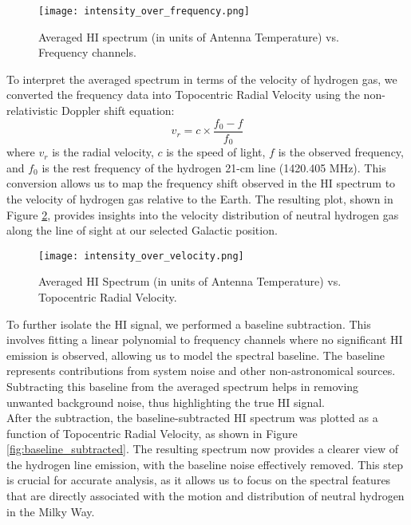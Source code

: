 \documentclass[linenumbers,twocolumn]{aastex631}
\begin{document}
\begin{figure}[h]
    \centering
    \texttt{[image: intensity\_over\_frequency.png]}
    \caption{Averaged HI spectrum (in units of Antenna Temperature) vs. Frequency channels.}
    \label{fig:intensity_over_frequency}
\end{figure}

To interpret the averaged spectrum in terms of the velocity of hydrogen gas, we converted the frequency data into Topocentric Radial Velocity using the non-relativistic Doppler shift equation:
\[
v_r = c \times \frac{f_0 - f}{f_0}
\]
where \(v_r\) is the radial velocity, \(c\) is the speed of light, \(f\) is the observed frequency, and \(f_0\) is the rest frequency of the hydrogen 21-cm line (1420.405 MHz). This conversion allows us to map the frequency shift observed in the HI spectrum to the velocity of hydrogen gas relative to the Earth. The resulting plot, shown in Figure \ref{fig:intensity_over_velocity}, provides insights into the velocity distribution of neutral hydrogen gas along the line of sight at our selected Galactic position. \\

\begin{figure}[h]
    \centering
    \texttt{[image: intensity\_over\_velocity.png]}
    \caption{Averaged HI Spectrum (in units of Antenna Temperature) vs. Topocentric Radial Velocity.}
    \label{fig:intensity_over_velocity}
\end{figure}

To further isolate the HI signal, we performed a baseline subtraction. This involves fitting a linear polynomial to frequency channels where no significant HI emission is observed, allowing us to model the spectral baseline. The baseline represents contributions from system noise and other non-astronomical sources. Subtracting this baseline from the averaged spectrum helps in removing unwanted background noise, thus highlighting the true HI signal. \\

After the subtraction, the baseline-subtracted HI spectrum was plotted as a function of Topocentric Radial Velocity, as shown in Figure \ref{fig:baseline_subtracted}. The resulting spectrum now provides a clearer view of the hydrogen line emission, with the baseline noise effectively removed. This step is crucial for accurate analysis, as it allows us to focus on the spectral features that are directly associated with the motion and distribution of neutral hydrogen in the Milky Way.
\end{document}
